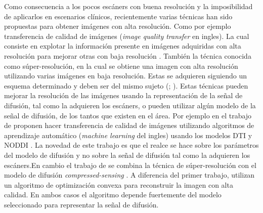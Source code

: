 \documentclass[a4paper,10pt]{article}
\begin{document}
Como consecuencia a los pocos escáners con buena resolución y la imposibilidad de aplicarlos en escenarios 
clínicos, recientemente varias técnicas han sido propuestas para obtener imágenes con alta resolución. Como 
por ejemplo transferencia de calidad de imágenes (\textit{image quality transfer} en ingles). La cual 
consiste en explotar la 
información presente en imágenes adquiridas con alta resolución para mejorar otras con baja resolución 
\citep{Alexander2014}. También la técnica conocida como súper-resolución, en 
la cual se obtiene una imagen con alta resolución utilizando varias imágenes en baja resolución. 
Estas se adquieren siguiendo un esquema determinado y deben ser del mismo sujeto (\citep{Irani1993,Robinson2010}; 
\citep{Ning2016}). Estas técnicas pueden mejorar la resolución de las imágenes usando la representación de la señal de 
difusión, tal como la adquieren los escáners, o pueden utilizar algún modelo de la señal de difusión, de los tantos 
que existen en el área.
Por ejemplo en el trabajo de \citet{Alexander2014} proponen hacer transferencia de 
calidad de imágenes utilizando algoritmos de aprendizaje automático (\textit{machine learning} del ingles) usando los 
modelos DTI y NODDI \citep{Zhang2012}. 
La novedad de este trabajo es que el realce se hace sobre los parámetros del modelo de difusión y no sobre la 
señal de difusión tal como la adquieren los escáners.En cambio el trabajo de \citet{Ning2016} se combina la t\'ecnica de 
súper-resolución con el modelo de difusión \textit{compressed-sensing} \citep{Naidoo2015}. A diferencia del primer 
trabajo, utilizan un algoritmo de optimización convexa para reconstruir la imagen con alta calidad. En ambos casos el 
algoritmo depende fuertemente del modelo seleccionado para representar la señal de difusión.
\end{document}

